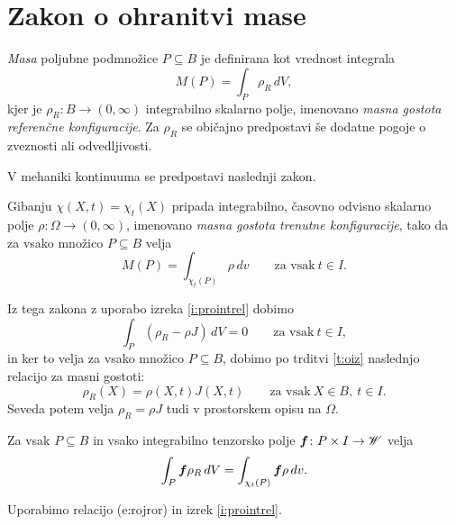 \section{Zakon o ohranitvi mase}


\emph{Masa} poljubne podmnožice $P\subseteq B$ je definirana kot vrednost integrala
\[ M(P)=\int_P\rho_R\,dV, \]
kjer je $\rho_R\colon B\to(0,\infty)$ integrabilno skalarno polje, imenovano
\emph{masna gostota referenčne konfiguracije}.
Za $\rho_R$ se običajno predpostavi še dodatne pogoje o zveznosti ali odvedljivosti.

\begin{comment}
Poljubni konfiguraciji materialnega telesa $\kappa\colon B\to\E$ pripada
integrabilno skalarno polje $\rho_{\kappa}\colon B\to(0,\infty)$, imenovano
\emph{masna gostota konfiguracije $\kappa$}, tako da za vsako množico $P\subseteq B$ velja
\[ M(P)=\int_{\kappa(P)}\rho_{\kappa}\,dv. \]
\end{comment}

V mehaniki kontinuuma se predpostavi naslednji zakon.
\begin{aksiom}
	Gibanju $\chi(X,t)=\chi_t(X)$ pripada integrabilno, časovno odvisno skalarno polje
	$\rho\colon\Omega\to(0,\infty)$, imenovano \emph{masna gostota trenutne konfiguracije},
	tako da za vsako množico $P\subseteq B$ velja
	\[ M(P)=\int_{\chi_t(P)}\rho\,dv\qquad\textrm{za vsak}\ t\in I. \]
\end{aksiom}

Iz tega zakona z uporabo izreka \ref{i:prointrel} dobimo
\[ \int_{P}(\rho_R-\rho J)\,dV=0 \qquad\textrm{za vsak}\ t\in I, \]
in ker to velja za vsako množico $P\subseteq B$, dobimo po trditvi \ref{t:oiz}
naslednjo relacijo za masni gostoti:
\begin{equation} \label{e:rojror}
	\rho_R(X)=\rho(X,t)J(X,t)\qquad\textrm{za vsak}\ X\in B,\ t\in I.
\end{equation}
Seveda potem velja $\rho_R=\rho J$ tudi v prostorskem opisu na $\Omega$.

\begin{posledica} \label{p:roji}
	Za vsak $P\subseteq B$ in vsako
	integrabilno tenzorsko polje $\boldsymbol f\colon P\times I\to\mathscr W$ velja
	\[
		\int_{P}\boldsymbol f\rho_R\,dV=\int_{\chi_t(P)}\boldsymbol f\rho\,dv.
	\]
\end{posledica}

\proof
	Uporabimo relacijo ({e:rojror}) in izrek \ref{i:prointrel}.
\endproof

